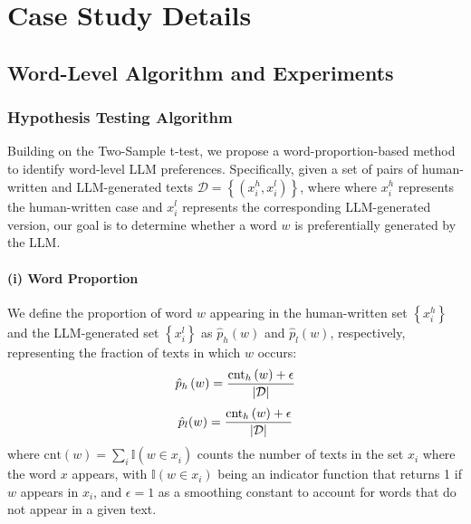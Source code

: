 
\section{Case Study Details}
\label{app: cs-details}
\subsection{Word-Level Algorithm and Experiments}
\subsubsection{Hypothesis Testing Algorithm}
\label{app:TestingAlgorithm}
Building on the Two-Sample t-test, we propose a word-proportion-based method to identify word-level LLM preferences.
Specifically, given a set of pairs of human-written and LLM-generated texts $\mathcal{D} =\left\{ \left( x_{i}^{h}, x_{i}^{l} \right) \right\} $, where where $x_i^{h}$ represents the human-written case and $x_i^{l}$ represents the corresponding LLM-generated version, our goal is to determine whether a word $w$ is preferentially generated by the LLM.

\paragraph{(i) Word Proportion} 
We define the proportion of word $w$ appearing in the human-written set $\left\{ x_{i}^{h} \right\} $ and the LLM-generated set $\left\{ x_{i}^{l} \right\} $ as $\hat{p}_h\left( w \right) $ and $\hat{p}_l\left( w \right) $, respectively, representing the fraction of texts in which $w$ occurs:
\begin{equation}
    \hat{p}_h\left(w\right) ={\small{\frac{\mathrm{cnt}_h\left( w \right) +\epsilon}{\left| \mathcal{D} \right|}}}
\end{equation}
\begin{equation}
    \hat{p}_l(w) ={\small{\frac{\mathrm{cnt}_h\left( w \right) +\epsilon}{\left| \mathcal{D} \right|}}}
\end{equation}
where $\mathrm{cnt}\left( w \right) =\sum\nolimits_i^{}{\mathbb{I} \left( w\in x_{i}^{} \right)}$ counts the number of texts in the set ${x_i}$ where the word $x$ appears, with $\mathbb{I}(w \in x_i)$ being an indicator function that returns 1 if $w$ appears in $x_i$, and $\epsilon=1$ as a smoothing constant to account for words that do not appear in a given text.




